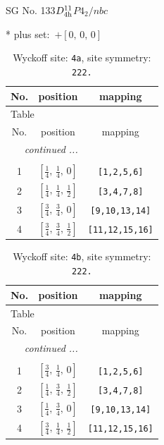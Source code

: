 \documentclass[fleqn,8pt]{jsarticle}
\begin{document}
\setcounter{MaxMatrixCols}{32}

\renewcommand{\tablename}{Table~}
\renewcommand{\figurename}{Figure~}
\begin{center}
\LARGE
SG No. 133\quad$D_{\rm 4h}^{11}$\quad$P4_2/nbc$\quad[ tetragonal ]
\end{center}
* plus set:\,\,\,$+\left[ 0,\, 0,\, 0 \right]$
\renewcommand{\arraystretch}{1.2}
\begin{longtable}{ccc}
\caption{Wyckoff site: {\tt 4a}, site symmetry: {\tt 222.}}
 \\
 \hline \hline
No. & position & mapping \\ \hline \endfirsthead

\multicolumn{2}{l}{\tablename\ \thetable{}} \\
 \hline \hline
No. & position & mapping \\ \hline \endhead

 \hline \hline
\multicolumn{2}{r}{\footnotesize\it continued ...} \\ \endfoot

 \hline \hline
\multicolumn{2}{r}{} \\ \endlastfoot

1 & $\left[ \frac{1}{4},\, \frac{1}{4},\, 0 \right]$ & {\tt [1,2,5,6]} \\ \hline
2 & $\left[ \frac{1}{4},\, \frac{1}{4},\, \frac{1}{2} \right]$ & {\tt [3,4,7,8]} \\ \hline
3 & $\left[ \frac{3}{4},\, \frac{3}{4},\, 0 \right]$ & {\tt [9,10,13,14]} \\ \hline
4 & $\left[ \frac{3}{4},\, \frac{3}{4},\, \frac{1}{2} \right]$ & {\tt [11,12,15,16]} \\
\end{longtable}
\renewcommand{\arraystretch}{1.2}
\begin{longtable}{ccc}
\caption{Wyckoff site: {\tt 4b}, site symmetry: {\tt 222.}}
 \\
 \hline \hline
No. & position & mapping \\ \hline \endfirsthead

\multicolumn{2}{l}{\tablename\ \thetable{}} \\
 \hline \hline
No. & position & mapping \\ \hline \endhead

 \hline \hline
\multicolumn{2}{r}{\footnotesize\it continued ...} \\ \endfoot

 \hline \hline
\multicolumn{2}{r}{} \\ \endlastfoot

1 & $\left[ \frac{3}{4},\, \frac{1}{4},\, 0 \right]$ & {\tt [1,2,5,6]} \\ \hline
2 & $\left[ \frac{1}{4},\, \frac{3}{4},\, \frac{1}{2} \right]$ & {\tt [3,4,7,8]} \\ \hline
3 & $\left[ \frac{1}{4},\, \frac{3}{4},\, 0 \right]$ & {\tt [9,10,13,14]} \\ \hline
4 & $\left[ \frac{3}{4},\, \frac{1}{4},\, \frac{1}{2} \right]$ & {\tt [11,12,15,16]} \\
\end{longtable}
\end{document}
